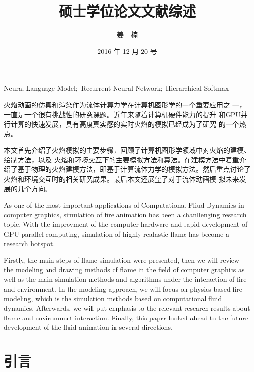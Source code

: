 \documentclass[12pt,a4paper]{article}
\title{硕士学位论文文献综述}
\author{姜~~楠}
\date{2016 年 12 月 20 号}
\begin{document}
\maketitle



{Neural Language Model;\ Recurrent Neural Network;\ Hierarchical Softmax}

\begin{abstract_ch}
  火焰动画的仿真和渲染作为流体计算力学在计算机图形学的一个重要应用之
  一，一直是一个很有挑战性的研究课题。近年来随着计算机硬件能力的提升
  和GPU并行计算的快速发展，具有高度真实感的实时火焰的模拟已经成为了研究
  的一个热点。

  本文首先介绍了火焰模拟的主要步骤，回顾了计算机图形学领域中对火焰的建模、绘制方法，以及
  火焰和环境交互下的主要模拟方法和算法。在建模方法中着重介绍了基于物理的火焰建模方法，即基于计算流体力学的模拟方法。然后重点讨论了火焰和环境交互时的相关研究成果。最后本文还展望了对于流体动画模
  拟未来发展的几个方向。
\end{abstract_ch}
\newpage
\begin{abstract_en}
  As one of the most important applications of Computational Fliud
  Dynamics in computer graphics, simulation of fire animation has been
  a chanllenging research topic. With the improvment of the computer
  hardware and rapid development of GPU parallel computing, simulation
  of highly realastic flame has become a research hotspot.


 Firstly, the main steps of flame simulation were presented, then we
will review the modeling and drawing methods of flame in the field of
computer graphics as well as the main simulation methods and
algorithms under the interaction of fire and environment. In the
modeling approach, we will focus on physics-based fire modeling, which
is the simulation methods based on computational fluid dynamics.
Afterwards, we will put emphasis to the relevant research results
about flame and environment interaction. Finally, this paper looked
ahead to the future development of the fluid animation in several
directions.

\end{abstract_en}
\newpage
\tableofcontents
\newpage

\section{引言}
\end{document}
